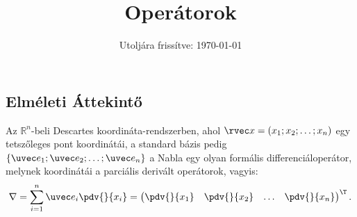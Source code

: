 \documentclass[a4paper, 12pt]{scrartcl}
\title{Operátorok}
\date{Utoljára frissítve: \today}
\begin{document}
\maketitle

\subsection{Elméleti Áttekintő}

\begin{definition}
  Az $\mathbb R^n$-beli Descartes koordináta-rendszerben, ahol $\rvec x = (x_1;
    x_2; \dots; x_n)$ egy tetszőleges pont koordinátái, a standard bázis pedig
  $\{ \uvec e_1; \uvec e_2; \dots; \uvec e_n \}$ a Nabla egy olyan formális
  differenciáloperátor, melynek koordinátái a parciális derivált operátorok,
  vagyis:
  $$
    \nabla = \sum_{i = 1}^n \uvec e_i \pdv{}{x_i}
    =
    \begin{pmatrix}
      \displaystyle\pdv{}{x_1} &
      \displaystyle\pdv{}{x_2} &
      \hdots                   &
      \displaystyle\pdv{}{x_n}
    \end{pmatrix}^\T
    \text.
  $$
\end{definition}
\end{document}
